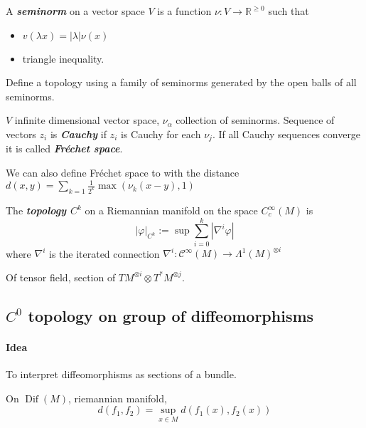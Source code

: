 \begin{defn}
	A \textit{\textbf{seminorm}} on a vector space $V$ is a function $\nu:V\to \mathbb{R}^{\geq 0}$ such that
	\begin{itemize}
	\item $v(\lambda x)=|\lambda| \nu(x)$ 
	\item triangle inequality.
	\end{itemize}
\end{defn}

\begin{defn}
	Define a topology using a family of seminorms generated by the open balls of all seminorms.
\end{defn}

\begin{defn}
	$V$ infinite dimensional vector space, $\nu_{\alpha}$ collection of seminorms. Sequence of vectors $z_i$ is \textit{\textbf{Cauchy}} if  $z_i$ is Cauchy for each $\nu_j$. If all Cauchy sequences converge it is called \textit{\textbf{Fr\'echet space}}.
\end{defn}

We can also define Fr\'echet space to with the distance $d(x,y)=\sum_{k=1}\frac{1}{2^k}\max(\nu_k(x-y),1)$ 

\begin{defn}
	The \textit{\textbf{topology $C^k$}} on a Riemannian manifold on the space $C^\infty_{c}(M)$ is
	\[|\varphi|_{C^k}:=\operatorname{sup}\sum_{i=0}^k|\nabla^i\varphi|\]
	where $\nabla^i$ is the iterated connection $\nabla^i:\mathcal{C}^\infty(M)\to \Lambda^{1}(M)^{\otimes i}$
\end{defn}

\begin{defn}
	Of tensor field, section of $TM^{\otimes i}\otimes T^*M^{\otimes j}$.
\end{defn}

\subsection{$C^0$ topology on group of diffeomorphisms}

\paragraph{Idea} To interpret diffeomorphisms as sections of a bundle. 

\begin{defn}
	On  $\operatorname{Dif}(M)$, riemannian manifold,
	\[d(f_1,f_2)=\operatorname{sup}_{x\in M}d(f_1(x),f_2(x))\]
\end{defn}


